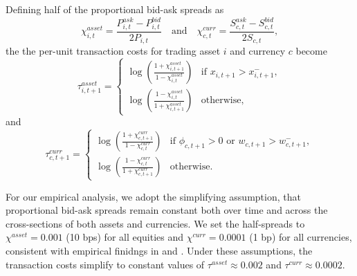 Defining half of the proportional bid-ask spreads as 
\begin{equation*}
\chi^{asset}_{i,t} = \frac{P^{ask}_{i,t} - P^{bid}_{i,t}}{2P_{i,t}} \quad \text{and} \quad \chi^{curr}_{c,t} = \frac{S^{ask}_{c,t} - S^{bid}_{c,t}}{2S_{c,t}},
\end{equation*}
the the per-unit transaction costs for trading asset $i$ and currency $c$ become
\begin{equation*}
\tau^{asset}_{i,t+1} = 
\begin{cases}
\log \left( \frac{1 + \chi^{asset}_{i,t+1}}{1 - \chi^{asset}_{i,t}} \right) & \text{if } x_{i,t+1} > x^{-}_{i,t+1}, \\
\log \left( \frac{1 - \chi^{asset}_{i,t}}{1 + \chi^{asset}_{i,t+1}} \right) & \text{otherwise,}
\end{cases}
\end{equation*}
and
\begin{equation*}
\tau^{curr}_{c,t+1} = 
\begin{cases}
\log \left( \frac{1 + \chi^{curr}_{c,t+1}}{1 - \chi^{curr}_{c,t}} \right) & \text{if } \phi_{c,t+1} > 0 \text{ or } w_{c,t+1} > w^{-}_{c,t+1}, \\
\log \left( \frac{1 - \chi^{curr}_{c,t}}{1 + \chi^{curr}_{c,t+1}} \right) & \text{otherwise.}
\end{cases}
\end{equation*}

For our empirical analysis, we adopt the simplifying assumption, that proportional bid-ask spreads remain constant both over time and across the cross-sections of both assets and currencies. We set the half-spreads to $\chi^{asset} = 0.001$ (10 bps) for all equities and $\chi^{curr} = 0.0001$ (1 bp) for all currencies, consistent with empirical finidngs in \cite{Jones2002} and \cite{NeelyWellerUlrich2009}. Under these assumptions, the transaction costs simplify to constant values of $\tau^{asset} \approx 0.002$ and $\tau^{curr} \approx 0.0002$. 
